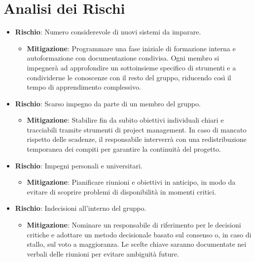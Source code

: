 \documentclass[a4paper,12pt]{article}
\begin{document}
\section{Analisi dei Rischi}
\begin{itemize}
    \item \textbf{Rischio}: Numero considerevole di nuovi sistemi da imparare.
        \begin{itemize}
            \item \textbf{Mitigazione}: Programmare una fase iniziale di formazione interna e autoformazione con documentazione condivisa. Ogni membro si impegnerà ad approfondire un sottoinsieme specifico di strumenti e a condividerne le conoscenze con il resto del gruppo, riducendo così il tempo di apprendimento complessivo.
        \end{itemize}

    \item \textbf{Rischio}: Scarso impegno da parte di un membro del gruppo.
        \begin{itemize}
            \item \textbf{Mitigazione}: Stabilire fin da subito obiettivi individuali chiari e tracciabili tramite strumenti di project management. In caso di mancato rispetto delle scadenze, il responsabile interverrà con una redistribuzione temporanea dei compiti per garantire la continuità del progetto.
        \end{itemize}

    \item \textbf{Rischio}: Impegni personali e universitari.
        \begin{itemize}
            \item \textbf{Mitigazione}: Pianificare riunioni e obiettivi in anticipo, in modo da evitare di scoprire problemi di disponibilità in momenti critici. 
        \end{itemize}

    \item \textbf{Rischio}: Indecisioni all'interno del gruppo.
        \begin{itemize}
            \item \textbf{Mitigazione}: Nominare un responsabile di riferimento per le decisioni critiche e adottare un metodo decisionale basato sul consenso o, in caso di stallo, sul voto a maggioranza. Le scelte chiave saranno documentate nei verbali delle riunioni per evitare ambiguità future.
        \end{itemize}


\end{itemize}
\end{document}
